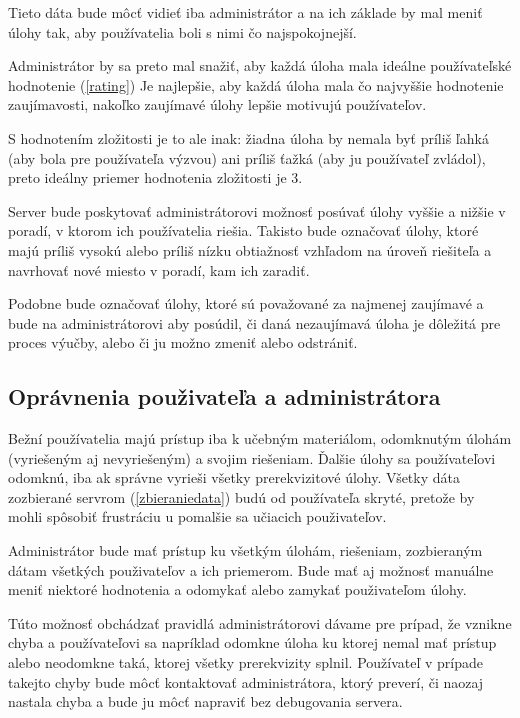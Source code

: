Tieto dáta bude môcť vidieť iba administrátor a na ich základe by mal meniť úlohy
tak, aby používatelia boli s nimi čo najspokojnejší.

Administrátor by sa preto mal snažiť, aby každá úloha mala ideálne používateľské hodnotenie (\ref{rating})
Je najlepšie, aby každá úloha mala čo najvyššie hodnotenie zaujímavosti,
nakoľko zaujímavé úlohy lepšie motivujú používateľov.

S hodnotením zložitosti je to ale inak: žiadna úloha by nemala byť príliš ľahká (aby bola pre používateľa výzvou) ani
príliš ťažká (aby ju používateľ zvládol), preto ideálny priemer hodnotenia zložitosti je 3.

Server bude poskytovať administrátorovi možnosť posúvať úlohy vyššie a nižšie v poradí,
v ktorom ich používatelia riešia. Takisto bude označovať úlohy, ktoré majú príliš vysokú alebo
príliš nízku obtiažnosť vzhľadom na úroveň riešiteľa a navrhovať nové miesto v poradí, kam ich zaradiť.

Podobne bude označovať úlohy, ktoré sú považované za najmenej zaujímavé a bude na administrátorovi
aby posúdil, či daná nezaujímavá úloha je dôležitá pre proces výučby, alebo či ju možno zmeniť alebo odstrániť.

\subsection{Oprávnenia použivateľa a administrátora}
Bežní používatelia majú prístup iba k učebným materiálom, odomknutým úlohám
(vyriešeným aj nevyriešeným) a svojim riešeniam. Ďalšie úlohy sa používateľovi odomknú,
iba ak správne vyrieši všetky prerekvizitové úlohy. Všetky dáta zozbierané servrom (\ref{zbieraniedata})
budú od používateľa skryté, pretože by mohli spôsobiť frustráciu u pomalšie sa učiacich použivateľov.

Administrátor bude mať prístup ku všetkým úlohám, riešeniam, zozbieraným dátam všetkých použivateľov
a ich priemerom. Bude mať aj možnosť manuálne meniť niektoré hodnotenia a odomykať alebo zamykať použivateľom úlohy.

Túto možnosť obchádzať pravidlá administrátorovi dávame pre prípad, že vznikne chyba a
používateľovi sa napríklad odomkne úloha ku ktorej nemal mať prístup alebo neodomkne taká,
ktorej všetky prerekvizity splnil. Používateľ v prípade takejto chyby bude môcť kontaktovať
administrátora, ktorý preverí, či naozaj nastala chyba a bude ju môcť napraviť bez debugovania servera.
